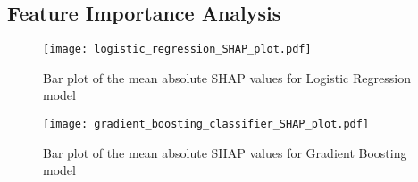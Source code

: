 \documentclass[11pt]{article}
\begin{document}
\subsection{Feature Importance Analysis}

\begin{figure}
    \centering
    \texttt{[image: logistic\_regression\_SHAP\_plot.pdf]}
    \caption{Bar plot of the mean absolute SHAP values for Logistic Regression model}
    \label{fig:LogRegSHAP}
\end{figure}

\begin{figure}
    \centering
    \texttt{[image: gradient\_boosting\_classifier\_SHAP\_plot.pdf]}
    \caption{Bar plot of the mean absolute SHAP values for Gradient Boosting model}
    \label{fig:gbcSHAP}
\end{figure}
\end{document}
